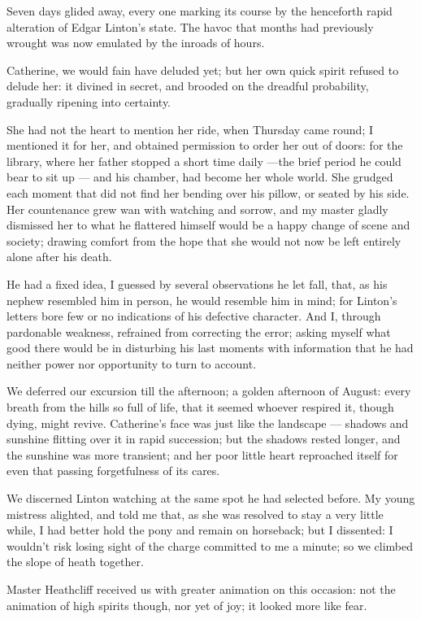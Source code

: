 \par Seven days glided away, every one marking its course by the henceforth rapid alteration of Edgar Linton's state. The havoc that months had previously wrought was now emulated by the inroads of hours.
\par Catherine, we would fain have deluded yet; but her own quick spirit refused to delude her: it divined in secret, and brooded on the dreadful probability, gradually ripening into certainty.
\par She had not the heart to mention her ride, when Thursday came round; I mentioned it for her, and obtained permission to order her out of doors: for the library, where her father stopped a short time daily —the brief period he could bear to sit up — and his chamber, had become her whole world. She grudged each moment that did not find her bending over his pillow, or seated by his side. Her countenance grew wan with watching and sorrow, and my master gladly dismissed her to what he flattered himself would be a happy change of scene and society; drawing comfort from the hope that she would not now be left entirely alone after his death.
\par He had a fixed idea, I guessed by several observations he let fall, that, as his nephew resembled him in person, he would resemble him in mind; for Linton's letters bore few or no indications of his defective character. And I, through pardonable weakness, refrained from correcting the error; asking myself what good there would be in disturbing his last moments with information that he had neither power nor opportunity to turn to account.
\par We deferred our excursion till the afternoon; a golden afternoon of August: every breath from the hills so full of life, that it seemed whoever respired it, though dying, might revive. Catherine's face was just like the landscape — shadows and sunshine flitting over it in rapid succession; but the shadows rested longer, and the sunshine was more transient; and her poor little heart reproached itself for even that passing forgetfulness of its cares.
\par We discerned Linton watching at the same spot he had selected before. My young mistress alighted, and told me that, as she was resolved to stay a very little while, I had better hold the pony and remain on horseback; but I dissented: I wouldn't risk losing sight of the charge committed to me a minute; so we climbed the slope of heath together.
\par Master Heathcliff received us with greater animation on this occasion: not the animation of high spirits though, nor yet of joy; it looked more like fear.
